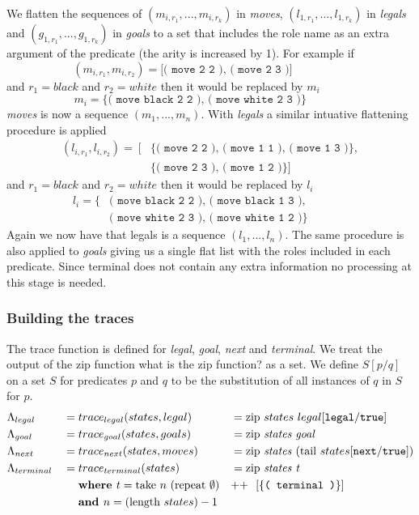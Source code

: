 We flatten the sequences of $(m_{i,r_1},...,m_{i,r_k})$ in \textit{moves}, $(l_{1,r_1},...,l_{1,r_k})$ in \textit{legals} and $(g_{1,r_1},...,g_{1,r_k})$ in \textit{goals} to a set that includes the role name as an extra argument of the predicate (the arity is increased by 1). For example if
\[(m_{i,r_1},m_{i,r_2}) = \texttt{[( move 2 2 ), ( move 2 3 )]}\ \ \ \ \ \ \ \ \ \ \ \ \ \ \ \ \ \ \ \ \ \ \]
and $r_1 = black$ and $r_2 = white$ then it would be replaced by $m_i$
\[m_i = \texttt{\{( move black 2 2 ), ( move white 2 3 )\}}\ \ \ \ \ \ \ \ \ \ \ \ \ \ \ \ \]
\textit{moves} is now a sequence $(m_1,...,m_n)$. With \textit{legals} a similar intuative flattening procedure is applied
\begin{align*}
(l_{i,r_1},l_{i,r_2}) =\ [&\{\texttt{( move 2 2 ), ( move 1 1 ), ( move 1 3 )}\}, \\
&\{\texttt{( move 2 3 ), ( move 1 2 )}\}]
\end{align*}
and $r_1 = black$ and $r_2 = white$ then it would be replaced by $l_i$
\begin{align*}
l_i = \{&\texttt{( move black 2 2 ), ( move black 1 3 ),}\ \ \ \ \ \ \ \ \ \ \ \ \ \ \ \ \ \\ &\texttt{( move white 2 3 ), ( move white 1 2 )}\}
\end{align*}
Again we now have that legals is a sequence $(l_1,...,l_n)$. The same procedure is also applied to \textit{goals} giving us a single flat list with the roles included in each predicate. Since terminal does not contain any extra information no processing at this stage is needed.
\subsubsection{Building the traces}
The trace function is defined for \textit{legal}, \textit{goal}, \textit{next} and \textit{terminal}. We treat the output of the zip function \ac{what is the zip function?} as a set. We define $S[p/q]$ on a set $S$ for predicates $p$ and $q$ to be the substitution of all instances of $q$ in $S$ for $p$.
\begin{align*}
&\Lambda_{legal} &&= trace_{legal}(states,legal) &&= \text{zip } states\ legal[\texttt{legal}/\texttt{true}] \\
&\Lambda_{goal} &&= trace_{goal}(states,goals) &&= \text{zip \textit{states goal}} \\
&\Lambda_{next} &&= trace_{next}(states,moves) &&= \text{zip \textit{states} } \text{(tail }states[\texttt{next}/\texttt{true}]) \\
&\Lambda_{terminal} &&= trace_{terminal}(states) &&= \text{zip \textit{states t}} \\
&&&\ \ \ \ \textbf{where  } t =\text{take } n\ (\text{repeat } \emptyset ) &&\text{++}\ \ [\{\texttt{( terminal )}\}] \\
&&&\ \ \ \ \textbf{and } n = (\text{length }states) - 1 &&
\end{align*}


